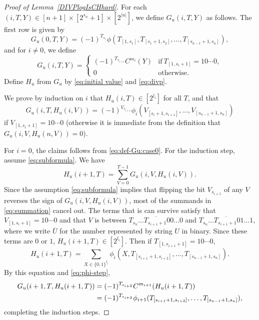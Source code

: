 \begin{proof}[\textup{Proof of Lemma~\ref{DIVPlogIsCHhard}}]
For each $(i, T, Y) \in [n+1] \times [2^{s_n}+1] \times [2^{|u|}]$,
we define $G_u (i, T, Y)$ as follows.
The first row is given by
 \begin{equation}\label{eq:def-Gu:case0}
  G_u(0,T,Y) = 
   (-1)^{T_{s_1}}\phi(T_{[1,s_1]}, T_{[s_1+1,s_2]},
    \dots, T_{[s_{n-1}+1,s_n]}), 
 \end{equation}
and for $i \neq 0$, we define 
 \begin{equation} 
  G_u(i,T,Y) = 
   \begin{cases}
    (-1)^{T_{s_{i+1}}} C^{m_i}(Y) 
    & \text{if} \ T_{[1,s_i+1]} = 10 \cdots 0, \\
    0 & \text{otherwise}.
   \end{cases} 
 \end{equation}
Define $H_u$ from $G_u$ by \eqref{eq:initial value} and \eqref{eq:divp}.

We prove by induction on $i$ that $H_u(i, T) \in [2^{l_i}]$ for all $T$, and that 
 \begin{equation} \label{eq:subformula}
  G_u(i,T,H_u(i,V)) = (-1)^{V_{s_{i+1}}} 
   \phi_i(V_{[s_i+1, s_{i+1}]}, \dots, V_{[s_{n-1}+1, s_n]})
 \end{equation}
if $V_{[1, s_i +1]} = 10 \cdots 0$ 
(otherwise it is immediate from the definition that $G_u(i, V, H_u(n, V)) = 0$).

For $i=0$, the claims follows from \eqref{eq:def-Gu:case0}.
For the induction step, assume \eqref{eq:subformula}. 
We have
 \begin{equation} \label{eq:summation}
  H_u(i+1, T) 
  = \sum_{V = 0}^{T-1} G_u(i, V, H_u(i, V)).
 \end{equation}
Since the assumption \eqref{eq:subformula} implies that flipping the bit $V_{s_{i+1}}$ of
any $V$ reverses the sign of $G_u(i, V, H_u(i, V))$,
most of the summands in \eqref{eq:summation} cancel out.
The terms that is can survive satisfy that $V_{[1, s_i+1]} = 10 \cdots 0$ and
that $V$ is between $\overline{T_{s_n} \dots T_{s_{i+1}+1} 00 \dots 0}$ and 
$\overline{T_{s_n} \dots T_{s_{i+1}+1} 01 \dots 1}$,
where we write $\overline U$ for the number represented by string $U$ in binary.
Since these terms are $0$ or $1$, $H_u(i+1, T) \in [2^{l_i}]$.
Then if $T_{[1,s_{i+1}+1]} = 10 \cdots 0$,
 \begin{equation}
  H_u(i+1, T) = \sum_{X \in \{0,1\}^{l_i}}
  \phi_i(X, T_{[s_{i+1}+1, s_{i+2}]}, \dots, T_{[s_{n-1}+1, s_n]}).
 \end{equation}
By this equation and \eqref{eq:phi-step},
 \begin{align}
  G_u(i+1,T,H_u(i+1,T)) 
  &= (-1)^{T_{s_{i+2}}} C^{m_{i+1}} (H_u(i+1, T))
  \notag
  \\
  &= (-1)^{T_{s_{i+2}}} \phi_{i+1}(T_{[s_{i+1}+1, s_{i+2}]}, \dots, T_{[s_{n-1}+1, s_n]}),
 \end{align}
completing the induction steps.


\end{proof}
